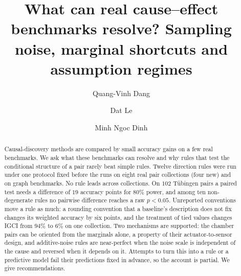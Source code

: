 \documentclass[USenglish,onecolumn]{article}
\begin{document}

\author[1]{Quang-Vinh Dang}

\author*[2]{Dat Le}

\author[3]{Minh Ngoc Dinh}




\title{\huge What can real cause--effect benchmarks resolve? Sampling noise, marginal shortcuts and assumption regimes}


\begin{abstract}
{Causal-discovery methods are compared by small accuracy gains on a few real benchmarks. We ask what these benchmarks can resolve and why rules that test the conditional structure of a pair rarely beat simple rules. Twelve direction rules were run under one protocol fixed before the runs on eight real pair collections (four new) and on graph benchmarks. No rule leads across collections. On $102$ T\"ubingen pairs a paired test needs a difference of $19$ accuracy points for $80\%$ power, and among ten non-degenerate rules no pairwise difference reaches a raw $p<0.05$. Unreported conventions move a rule as much: a rounding convention that a baseline's description does not fix changes its weighted accuracy by six points, and the treatment of tied values changes IGCI from $94\%$ to $6\%$ on one collection. Two mechanisms are supported: the chamber pairs can be oriented from the marginals alone, a property of their actuator-to-sensor design, and additive-noise rules are near-perfect when the noise scale is independent of the cause and reversed when it depends on it. Attempts to turn this into a rule or a predictive model fail their predictions fixed in advance, so the account is partial. We give recommendations.}
\end{abstract}


\maketitle











\end{document}
